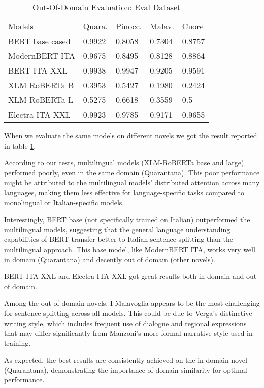 \documentclass[11pt]{article}
\begin{document}
\begin{table}[]
	\small
	\caption{Out-Of-Domain Evaluation: Eval Dataset}
	\begin{tabular}{lllll}
		Models & Quara. & Pinocc. & Malav. & Cuore \\
		BERT base cased & 0.9922      & 0.8058 & 0.7304        & 0.8757                  \\
		ModernBERT ITA  & 0.9675     & 0.8495   & 0.8128   & 0.8864                  \\
		BERT ITA XXL  & 0.9938      & 0.9947   & 0.9205     & 0.9591                 \\
		XLM RoBERTa B & 0.3953       & 0.5427   & 0.1980     & 0.2424                 \\
		XLM RoBERTa L & 0.5275       & 0.6618    & 0.3559   & 0.5               \\
		Electra ITA XXL  & 0.9923       & 0.9785    & 0.9171    & 0.9655             
	\end{tabular}
	\label{t2}
\end{table}

When we evaluate the same models on different novels we got the
result reported in table \ref{t2}.

According to our tests, multilingual models (XLM-RoBERTa base and large) performed poorly, even in the same domain (Quarantana).
This poor performance might be attributed to the multilingual models' distributed attention across many languages,
making them less effective for language-specific tasks compared to monolingual or Italian-specific models.

Interestingly, BERT base (not specifically trained on Italian) outperformed the multilingual models,
suggesting that the general language understanding capabilities of BERT transfer better to Italian sentence splitting than the multilingual approach.
This base model, like ModernBERT ITA, works very well in domain (Quarantana) and
decently out of domain (other novels).

BERT ITA XXL and Electra ITA XXL got great results both in domain and out of domain.

Among the out-of-domain novels, I Malavoglia appears to be the most challenging for sentence splitting across all models.
This could be due to Verga's distinctive writing style, which includes frequent use of dialogue and regional expressions that may differ significantly from Manzoni's more formal narrative style used in training.

As expected, the best results are consistently achieved on the in-domain novel (Quarantana),
demonstrating the importance of domain similarity for optimal performance.
\end{document}
